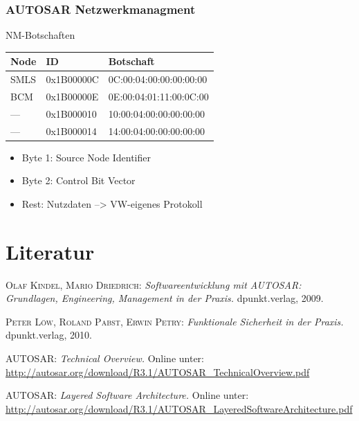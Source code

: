\documentclass[]{beamer}
\newcommand{\backupend}{
   \addtocounter{framenumbervorappendix}{-\value{framenumber}}
   \addtocounter{framenumber}{\value{framenumbervorappendix}} 
}
\begin{document}
\begin{frame}
\frametitle{AUTOSAR Netzwerkmanagment}
    \begin{exampleblock}{NM-Botschaften}
        \begin{table}
        \centering
            \begin{tabular}[h]{l l l}
                Node & ID & Botschaft\\
                \toprule
                SMLS        & 0x1B00000C & 0C:00:04:00:00:00:00:00\\
                BCM         & 0x1B00000E & 0E:00:04:01:11:00:0C:00\\
                ---         & 0x1B000010 & 10:00:04:00:00:00:00:00\\
                ---         & 0x1B000014 & 14:00:04:00:00:00:00:00\\
            \end{tabular}
        \label{tab:jitter_statistik}
        \end{table}
    \end{exampleblock}
    \begin{itemize}
        \item Byte 1: Source Node Identifier
        \item Byte 2: Control Bit Vector
        \item Rest: Nutzdaten --> VW-eigenes Protokoll
    \end{itemize}
\end{frame}






\section*{Literatur}
\label{sec:Literatur}

\begin{frame}


\begin{thebibliography}{10}

 \textsc{Olaf Kindel, Mario Driedrich}: {\em Softwareentwicklung mit AUTOSAR: Grundlagen, Engineering, Management in der Praxis.} dpunkt.verlag, 2009.

 \textsc{Peter Löw, Roland Pabst, Erwin Petry}: {\em Funktionale Sicherheit in der Praxis.} dpunkt.verlag, 2010.

 \textsc{AUTOSAR}: {\em Technical Overview.} Online unter: \url{http://autosar.org/download/R3.1/AUTOSAR_TechnicalOverview.pdf}

 \textsc{AUTOSAR}: {\em Layered Software Architecture.} Online unter: \url{http://autosar.org/download/R3.1/AUTOSAR_LayeredSoftwareArchitecture.pdf}

\end{thebibliography}


\end{frame}

\backupend
\end{document}
